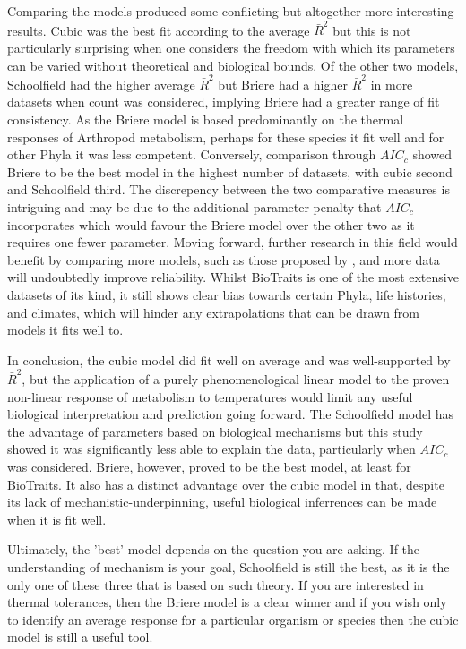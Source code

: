 \documentclass[twoside,twocolumn,11pt]{article}
\begin{document}
Comparing the models produced some conflicting but altogether more interesting results.
Cubic was the best fit according to the average $\bar{R}^2$ but this is not particularly
surprising when one considers the freedom with which its parameters can be varied without theoretical
and biological bounds. Of the other two models, Schoolfield had the higher average $\bar{R}^2$ but
Briere had a higher $\bar{R}^2$ in more datasets when count was considered, implying Briere had a 
greater range of fit consistency.
As the Briere model is based predominantly on the thermal responses of Arthropod metabolism, perhaps 
for these species it fit well and for other Phyla it was less competent.
Conversely, comparison through $AIC_c$ showed Briere to be the best model in the highest number 
of datasets, with cubic second and Schoolfield third. The discrepency between the two comparative
measures is intriguing and may be due to the additional parameter penalty that $AIC_c$ incorporates 
which would favour the Briere model over the other two as it requires one fewer parameter.
Moving forward, further research in this field would benefit by comparing more models, such as those proposed 
by \cite{DeLong2017}, and more data will undoubtedly improve reliability. Whilst BioTraits is one of the 
most extensive datasets
of its kind, it still shows clear bias towards certain Phyla, life histories, and climates, which will hinder
any extrapolations that can be drawn from models it fits well to.

In conclusion, the cubic model did fit well on average and was well-supported by $\bar{R}^2$, but the application 
of a purely phenomenological linear model to the proven non-linear response of metabolism to temperatures would limit any
useful biological interpretation and prediction going forward. The Schoolfield model has the advantage 
of parameters based on biological mechanisms but this study showed it was significantly less able to 
explain the data, particularly when $AIC_c$ was considered. Briere, however, proved to be the best model,
at least for BioTraits. It also has a distinct advantage over the cubic model in that, despite its lack
of mechanistic-underpinning, useful biological inferrences can be made when it is fit well. 

Ultimately, 
the 'best' model depends on the question you are asking. If the understanding of mechanism is your goal, Schoolfield
is still the best, as it is the only one of these three that is based on such theory. If you are interested 
in thermal tolerances, then the Briere model is a clear winner and if you wish only to identify an average response
for a particular organism or species then the cubic model is still a useful tool.
\end{document}
